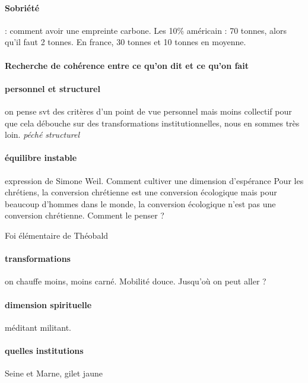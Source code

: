 \paragraph{Sobriété}  : comment avoir une empreinte carbone. Les 10\% américain : 70 tonnes, alors qu'il faut 2 tonnes. En france, 30 tonnes et 10 tonnes en moyenne.

\paragraph{Recherche de cohérence entre ce qu'on dit et ce qu'on fait}

\paragraph{personnel et structurel} on pense svt des critères d'un point de vue personnel mais moins collectif pour que cela débouche sur des transformations institutionnelles, nous en sommes très loin. \textit{péché structurel}

\paragraph{équilibre instable} expression de Simone Weil. Comment cultiver une dimension d'espérance 
Pour les chrétiens, la conversion chrétienne est une conversion écologique mais pour beaucoup d'hommes dans le monde, la conversion écologique n'est pas une conversion chrétienne. Comment le penser ? 

Foi élémentaire de Théobald

\paragraph{transformations} on chauffe moins, moins carné. Mobilité douce. Jusqu'où on peut aller ? 

\paragraph{dimension spirituelle} méditant militant.

\paragraph{quelles institutions} Seine et Marne, gilet jaune


